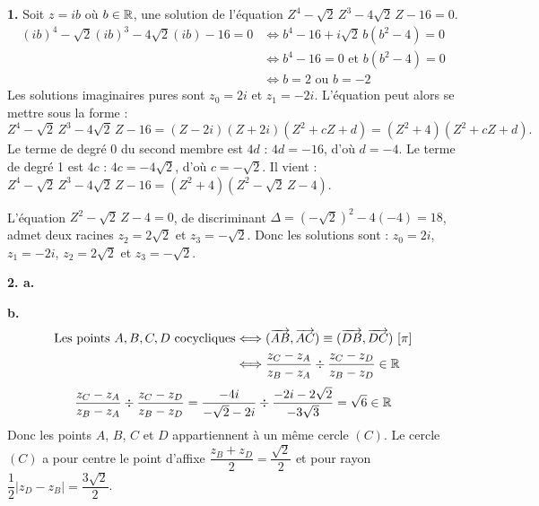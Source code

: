 \documentclass[11pt]{article}
\begin{document}


\textbf{1.} Soit $z = ib$ où $b \in \mathbb{R}$, une solution de l'équation $Z^4 - \sqrt{2}\,Z^3 - 4\sqrt{2}\,Z - 16 = 0$.
\begin{align*}
(ib)^4 - \sqrt{2}(ib)^3 - 4\sqrt{2}(ib) - 16 = 0 &\Longleftrightarrow b^4 - 16 + i\sqrt{2}\,b(b^2 - 4) = 0 \\
&\Longleftrightarrow b^4 - 16 = 0 \text{ et } b(b^2 - 4) = 0 \\
&\Longleftrightarrow b = 2 \text{ ou } b = -2
\end{align*}
Les solutions imaginaires pures sont $z_0 = 2i$ et $z_1 = -2i$. L'équation peut alors se mettre sous la forme :
\[ Z^4 - \sqrt{2}\,Z^3 - 4\sqrt{2}\,Z - 16 = (Z - 2i)(Z + 2i)(Z^2 + cZ + d) = (Z^2 + 4)(Z^2 + cZ + d). \]
Le terme de degré 0 du second membre est $4d$ : $4d = -16$, d'où $d = -4$. Le terme de degré 1 est $4c$ : $4c = -4\sqrt{2}$, d'où $c = -\sqrt{2}$. Il vient : $Z^4 - \sqrt{2}\,Z^3 - 4\sqrt{2}\,Z - 16 = (Z^2 + 4)(Z^2 - \sqrt{2}\,Z - 4)$.

L'équation $Z^2 - \sqrt{2}\,Z - 4 = 0$, de discriminant $\Delta = (-\sqrt{2})^2 - 4(-4) = 18$, admet deux racines $z_2 = 2\sqrt{2}$ et $z_3 = -\sqrt{2}$. Donc les solutions sont : $z_0 = 2i$, $z_1 = -2i$, $z_2 = 2\sqrt{2}$ et $z_3 = -\sqrt{2}$.

\textbf{2. a.} \begin{center}
\end{center}

\textbf{b.}
\begin{align*}
\text{Les points } A, B, C, D \text{ cocycliques} &\Longleftrightarrow (\vv{AB}, \vv{AC}) \equiv (\vv{DB}, \vv{DC})\ [\pi] \\
&\Longleftrightarrow \frac{z_C - z_A}{z_B - z_A} \div \frac{z_C - z_D}{z_B - z_D} \in \R
\end{align*}
\[ \frac{z_C - z_A}{z_B - z_A} \div \frac{z_C - z_D}{z_B - z_D} = \frac{-4i}{-\sqrt{2} - 2i} \div \frac{-2i - 2\sqrt{2}}{-3\sqrt{3}} = \sqrt{6} \in \mathbb{R} \]
Donc les points $A$, $B$, $C$ et $D$ appartiennent à un même cercle $(C)$. Le cercle $(C)$ a pour centre le point d'affixe $\dfrac{z_B + z_D}{2} = \dfrac{\sqrt{2}}{2}$ et pour rayon $\dfrac{1}{2}|z_D - z_B| = \dfrac{3\sqrt{2}}{2}$.
\end{document}
